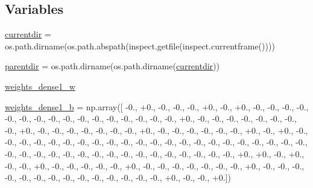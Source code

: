 \subsection*{Variables}
\begin{DoxyCompactItemize}
\item 
\hyperlink{namespacepybullet-gym_1_1pybulletgym_1_1examples_1_1roboschool-weights_1_1enjoy___t_f___reacher_py_bullet_env__v0__2017may_a78a0c4f797832c468f5e718120918061}{currentdir} = os.\+path.\+dirname(os.\+path.\+abspath(inspect.\+getfile(inspect.\+currentframe())))
\item 
\hyperlink{namespacepybullet-gym_1_1pybulletgym_1_1examples_1_1roboschool-weights_1_1enjoy___t_f___reacher_py_bullet_env__v0__2017may_a83bd2460a5f7a45e4ba0ca785ea148d7}{parentdir} = os.\+path.\+dirname(os.\+path.\+dirname(\hyperlink{namespacepybullet-gym_1_1pybulletgym_1_1examples_1_1roboschool-weights_1_1enjoy___t_f___reacher_py_bullet_env__v0__2017may_a78a0c4f797832c468f5e718120918061}{currentdir}))
\item 
\hyperlink{namespacepybullet-gym_1_1pybulletgym_1_1examples_1_1roboschool-weights_1_1enjoy___t_f___reacher_py_bullet_env__v0__2017may_a84169a79cc90b7aa207b0c425270725f}{weights\+\_\+dense1\+\_\+w}
\item 
\hyperlink{namespacepybullet-gym_1_1pybulletgym_1_1examples_1_1roboschool-weights_1_1enjoy___t_f___reacher_py_bullet_env__v0__2017may_ac3790b4813f62525cd80982ce8a0eaad}{weights\+\_\+dense1\+\_\+b} = np.\+array(\mbox{[} -\/0., +0., -\/0., -\/0., -\/0., +0., -\/0., +0., -\/0., -\/0., -\/0., -\/0., -\/0., -\/0., -\/0., -\/0., -\/0., -\/0., -\/0., -\/0., -\/0., -\/0., -\/0., -\/0., +0., -\/0., -\/0., -\/0., -\/0., -\/0., -\/0., -\/0., -\/0., +0., -\/0., -\/0., -\/0., -\/0., -\/0., -\/0., -\/0., +0., -\/0., -\/0., -\/0., -\/0., -\/0., -\/0., +0., -\/0., +0., -\/0., -\/0., -\/0., -\/0., -\/0., -\/0., -\/0., -\/0., -\/0., -\/0., -\/0., -\/0., -\/0., -\/0., -\/0., -\/0., -\/0., -\/0., -\/0., -\/0., -\/0., -\/0., -\/0., -\/0., -\/0., -\/0., -\/0., -\/0., -\/0., -\/0., -\/0., -\/0., -\/0., -\/0., -\/0., -\/0., -\/0., -\/0., +0., +0., -\/0., +0., -\/0., -\/0., +0., -\/0., -\/0., -\/0., -\/0., -\/0., +0., -\/0., -\/0., -\/0., -\/0., -\/0., -\/0., -\/0., +0., -\/0., -\/0., -\/0., -\/0., -\/0., -\/0., -\/0., -\/0., -\/0., -\/0., -\/0., -\/0., -\/0., -\/0., +0., -\/0., -\/0., +0.\mbox{]})

\end{DoxyCompactItemize}
